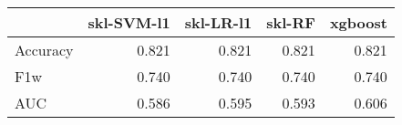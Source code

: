 \begin{tabular}{lrrrr}
\toprule
{} &  skl-SVM-l1 &  skl-LR-l1 &  skl-RF &  xgboost \\
\midrule
Accuracy &       0.821 &      0.821 &   0.821 &    0.821 \\
F1w      &       0.740 &      0.740 &   0.740 &    0.740 \\
AUC      &       0.586 &      0.595 &   0.593 &    0.606 \\
\bottomrule
\end{tabular}
